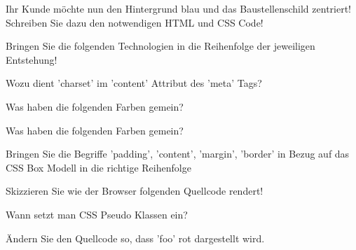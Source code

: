 \documentclass[10pt,ngerman]{examdesign}
\begin{document}
\begin{multiplechoice}
  \begin{question}
    Ihr Kunde m\"ochte nun den Hintergrund blau und das Baustellenschild
    zentriert! Schreiben Sie dazu den notwendigen HTML und CSS Code!
    \bigskip
  \end{question}

  \begin{question}
    Bringen Sie die folgenden Technologien in die Reihenfolge der jeweiligen
    Entstehung!
    \smallskip
  \end{question}

  \begin{question}
    Wozu dient 'charset' im 'content' Attribut des 'meta' Tags?
    \bigskip
  \end{question}

  \begin{question}
    Was haben die folgenden Farben gemein?
    \bigskip
  \end{question}

  \begin{question}
    Was haben die folgenden Farben gemein?
    \bigskip
  \end{question}

  \begin{question}
    Bringen Sie die Begriffe 'padding', 'content', 'margin', 'border'  in Bezug
    auf das CSS Box Modell in die richtige Reihenfolge
    \smallskip
  \end{question}


  \begin{question}
    Skizzieren Sie wie der Browser folgenden Quellcode rendert!
    \bigskip
  \end{question}

  \begin{question}
    Wann setzt man CSS Pseudo Klassen ein?
    \bigskip
  \end{question}

  \begin{question}
    \"Andern Sie den Quellcode so, dass 'foo' rot dargestellt wird.
    \bigskip
  \end{question}


\end{multiplechoice}
\end{document}
